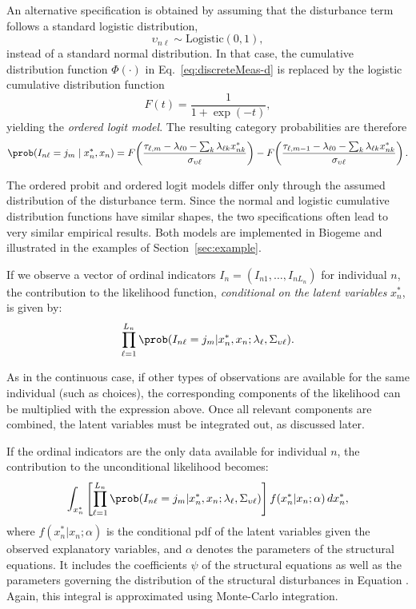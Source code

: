 \documentclass[12pt,a4paper]{article}
\begin{document}
An alternative specification is obtained by assuming that the
disturbance term follows a standard logistic distribution,
\[
\upsilon_{n\ell}\sim \text{Logistic}(0,1),
\]
instead of a standard normal distribution. In that case, the
cumulative distribution function \(\Phi(\cdot)\) in
Eq.~\eqref{eq:discreteMeas-d} is replaced by the logistic cumulative
distribution function
\[
F(t)=\frac{1}{1+\exp(-t)},
\]
yielding the \emph{ordered logit model}. The resulting category
probabilities are therefore
\begin{equation}
\label{eq:ordered_logit_probability}
\begin{aligned}
\prob(I_{n\ell}=j_m \mid x_n^*,x_n)
=
F\!\left(
\frac{
\tau_{\ell,m}
-\lambda_{\ell0}
-\sum_k \lambda_{\ell k} x_{nk}^*
}{\sigma_{\upsilon\ell}}
\right)
-
F\!\left(
\frac{
\tau_{\ell,m-1}
-\lambda_{\ell0}
-\sum_k \lambda_{\ell k} x_{nk}^*
}{\sigma_{\upsilon\ell}}
\right).
\end{aligned}
\end{equation}

The ordered probit and ordered logit models differ only through the
assumed distribution of the disturbance term. Since the normal and
logistic cumulative distribution functions have similar shapes, the
two specifications often lead to very similar empirical results. Both
models are implemented in Biogeme and illustrated in the examples of
Section~\ref{sec:example}.


If we observe a vector of ordinal indicators \( I_n = (I_{n1}, \ldots,
I_{nL_n}) \) for individual \( n \), the contribution to the
likelihood function, \emph{conditional on the latent variables} \(
x^*_{n} \), is given by:
\begin{equation}
\prod_{\ell=1}^{L_n} \prob(I_{n\ell} = j_m| x^*_n, x_n ; \lambda_\ell,
\Sigma_{\upsilon \ell}).
\end{equation}

As in the continuous case, if other types of observations are available
for the same individual (such as choices), the corresponding
components of the likelihood can be multiplied with the expression
above. Once all relevant components are combined, the latent variables
must be integrated out, as discussed later.

If the ordinal indicators are the only data available for
individual \( n \), the contribution to the unconditional likelihood
becomes:
\begin{equation}
\int_{x_n^*} \left[ \prod_{\ell=1}^{L_n} \prob(I_{n\ell} = j_m| x^*_n,
  x_n ; \lambda_\ell, \Sigma_{\upsilon \ell}) \right] f(x_n^*|x_n;\alpha) \,
dx_n^*,
\end{equation}
where \( f(x_n^*|x_n;\alpha) \) is the conditional pdf of the latent
variables given the observed explanatory variables, and
\(\alpha\) denotes the parameters of the structural equations. It includes the coefficients $\psi$ of the structural equations
as well as the parameters governing the distribution of the structural
disturbances in Equation .  Again, this integral is approximated using Monte-Carlo
integration.
\end{document}
